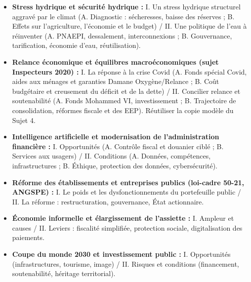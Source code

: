 \begin{itemize}
    \item \textbf{Stress hydrique et sécurité hydrique :} I. Un stress hydrique structurel aggravé par le climat (A. Diagnostic : sécheresses, baisse des réserves ; B. Effets sur l'agriculture, l'économie et le budget) / II. Une politique de l'eau à réinventer (A. PNAEPI, dessalement, interconnexions ; B. Gouvernance, tarification, économie d'eau, réutilisation).
    \item \textbf{Relance économique et équilibres macroéconomiques (sujet Inspecteurs 2020) :} I. La réponse à la crise Covid (A. Fonds spécial Covid, aides aux ménages et garanties Damane Oxygène/Relance ; B. Coût budgétaire et creusement du déficit et de la dette) / II. Concilier relance et soutenabilité (A. Fonds Mohammed VI, investissement ; B. Trajectoire de consolidation, réformes fiscale et des EEP). Réutiliser la copie modèle du Sujet 4.
    \item \textbf{Intelligence artificielle et modernisation de l'administration financière :} I. Opportunités (A. Contrôle fiscal et douanier ciblé ; B. Services aux usagers) / II. Conditions (A. Données, compétences, infrastructures ; B. Éthique, protection des données, cybersécurité).
    \item \textbf{Réforme des établissements et entreprises publics (loi-cadre 50-21, ANGSPE) :} I. Le poids et les dysfonctionnements du portefeuille public / II. La réforme : restructuration, gouvernance, État actionnaire.
    \item \textbf{Économie informelle et élargissement de l'assiette :} I. Ampleur et causes / II. Leviers : fiscalité simplifiée, protection sociale, digitalisation des paiements.
    \item \textbf{Coupe du monde 2030 et investissement public :} I. Opportunités (infrastructures, tourisme, image) / II. Risques et conditions (financement, soutenabilité, héritage territorial).
\end{itemize}
